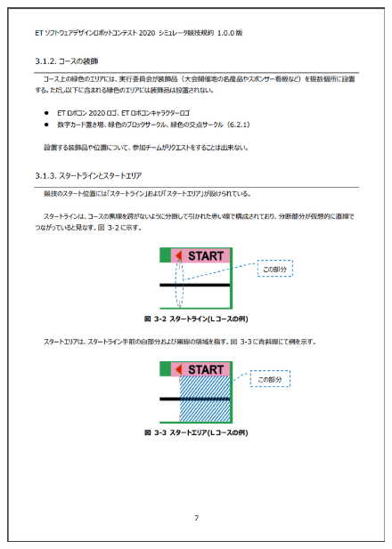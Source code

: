 \documentclass[uplatex, report, a4j, 10pt]{jsbook}
\begin{document}
\begin{figure}[tp]
    \begin{center}
    \includegraphics[width=\hsize]{specification/ET_4.eps}
    \end{center}
\end{figure}
\end{document}
